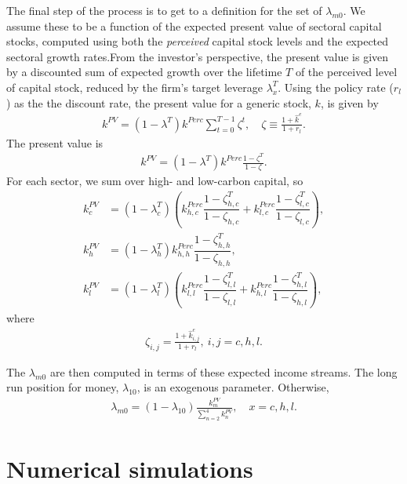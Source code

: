 \documentclass[authoryear]{article}
\begin{document}
The final step of the process is to get to a definition for the set of $\lambda_{m0}$. We assume these to be a function of the expected present value of sectoral capital stocks, computed using both the \emph{perceived} capital stock levels and the {expected} sectoral growth rates.From the investor's perspective, the present value is given by a discounted sum of expected growth over the lifetime $T$ of the perceived level of capital stock, reduced by the firm's target leverage $\lambda_x^T$. Using the policy rate ($r_l$) as the the discount rate, the present value for a generic stock, $k$, is given by
\begin{gather}
k^{PV} = (1 - \lambda^T) k^{Perc} \sum_{t = 0}^{T - 1}\zeta^t,\quad\zeta \equiv \frac{1+\hat{k}^e}{1+r_l}.
\end{gather}
The present value is
\begin{gather}
k^{PV} = (1 - \lambda^T) k^{Perc} \frac{1 - \zeta^T}{1 - \zeta}.
\end{gather}
For each sector, we sum over high- and low-carbon capital, so
\begin{align}
k_{c}^{PV} &= (1 - \lambda_c^T) \left(k_{h,c}^{Perc} \dfrac{1-\zeta_{h,c}^T}{1-\zeta_{h,c}} + k_{l,c}^{Perc} \dfrac{1-\zeta_{l,c}^T}{1-\zeta_{l,c}}\right),\\
k_{h}^{PV} &= (1 - \lambda_h^T) k_{h,h}^{Perc} \dfrac{1-\zeta_{h,h}^T}{1-\zeta_{h,h}},\\
k_{l}^{PV} &= (1 - \lambda_l^T) \left(k_{l,l}^{Perc} \dfrac{1-\zeta_{l,l}^T}{1-\zeta_{l,l}} + k_{h,l}^{Perc} \dfrac{1-\zeta_{h,l}^T}{1-\zeta_{h,l}}\right),
\end{align}
where
\begin{gather}
\zeta_{i,j} = \frac{1+\hat{k}^e_{i,j}}{1+r_l},\:i,j=c,h,l.
\end{gather}

The $\lambda_{m0}$ are then computed in terms of these expected income streams. The long run position for money, $\lambda_{10}$, is an exogenous parameter. Otherwise,
\begin{gather}
\lambda_{m0} = (1 - \lambda_{10}) \frac{k_m^{PV}}{\sum_{n=2}^4 k_n^{PV}}, \quad x=c,h,l.
\end{gather}

\section{Numerical simulations}
\label{sec:sim}
\end{document}
